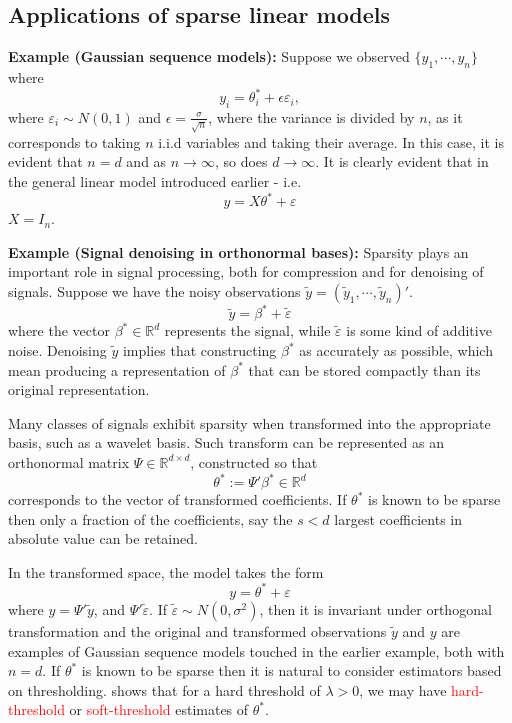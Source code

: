 \documentclass[10pt,handout,english]{beamer}
\newcommand{\R}{\mathbb{R}}
\begin{document}
\subsection{Applications of sparse linear models}

\begin{frame}[allowframebreaks]
\textbf{Example (Gaussian sequence models):}
Suppose we observed $\{y_1,\cdots,y_n\}$ where
\[
y_i=\theta_i^*+\epsilon\varepsilon_i,
\]
where $\varepsilon_i\sim N(0,1)$ and $\epsilon=\frac{\sigma}{\sqrt{n}}$, where the variance is divided by $n$, as it corresponds to taking $n$ i.i.d variables and taking their average. In this case, it is evident that $n=d$ and as $n\to\infty$, so does $d\to\infty$. It is clearly evident that in the general linear model introduced earlier - i.e.
\[
y=X\theta^*+\varepsilon
\]
$X=I_n$.

\textbf{Example (Signal denoising in orthonormal bases):} Sparsity plays an important role in signal processing, both for compression and for denoising of signals. Suppose we have the noisy observations $\tilde{y}=(\tilde{y}_1,\cdots,\tilde{y}_n)'$.
\[
\tilde{y}=\beta^*+\tilde{\varepsilon}
\]
where the vector $\beta^*\in\R^d$ represents the signal, while $\tilde{\varepsilon}$ is some kind of additive noise. Denoising $\tilde{y}$ implies that constructing $\beta^*$ as accurately as possible, which mean producing a representation of $\beta^*$ that can be stored compactly than its original representation.

Many classes of signals exhibit sparsity when transformed into the appropriate basis, such as a wavelet basis. Such transform can be represented as an orthonormal matrix $\Psi\in\R^{d\times d}$, constructed so that 
\[
\theta^*:=\Psi'\beta^*\in \R^d
\]
corresponds to the vector of transformed coefficients. If $\theta^*$ is known to be sparse then only a fraction of the coefficients, say the $s<d$ largest coefficients in absolute value can be retained.

In the transformed space, the model takes the form
\[
y =\theta^*+\varepsilon
\]
where $y=\Psi'\tilde{y}$, and $\Psi'\tilde{\varepsilon}$. If $\tilde{\varepsilon}\sim N(0,\sigma^2)$, then it is invariant under orthogonal transformation and the original and transformed observations $\tilde{y}$ and $y$ are examples of Gaussian sequence models touched in the earlier example, both with $n=d$. If $\theta^*$ is known to be sparse then it is natural to consider estimators based on thresholding. \citet{wainwright2019high} shows that for a hard threshold of $\lambda>0$, we may have \textcolor{red}{hard-threshold} or \textcolor{red}{soft-threshold} estimates of $\theta^*$.



\end{frame}
\end{document}

